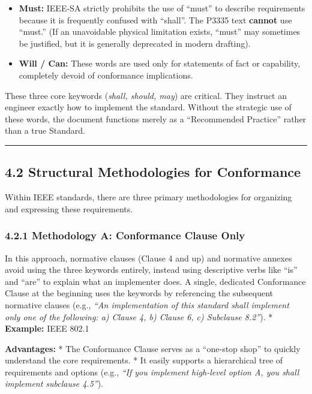 \documentclass[
]{article}
\begin{document}
\begin{itemize}
\item
  \textbf{Must:} IEEE-SA strictly prohibits the use of ``must'' to
  describe requirements because it is frequently confused with
  ``shall''. The P3335 text \textbf{cannot} use ``must.'' (If an
  unavoidable physical limitation exists, ``must'' may sometimes be
  justified, but it is generally deprecated in modern drafting).
\item
  \textbf{Will / Can:} These words are used only for statements of fact
  or capability, completely devoid of conformance implications.
\end{itemize}

These three core keywords (\emph{shall, should, may}) are critical. They
instruct an engineer exactly how to implement the standard. Without the
strategic use of these words, the document functions merely as a
``Recommended Practice'' rather than a true Standard.

\begin{center}\rule{0.5\linewidth}{0.5pt}\end{center}

\subsection{4.2 Structural Methodologies for
Conformance}\label{structural-methodologies-for-conformance}

Within IEEE standards, there are three primary methodologies for
organizing and expressing these requirements.

\subsubsection{4.2.1 Methodology A: Conformance Clause
Only}\label{methodology-a-conformance-clause-only}

In this approach, normative clauses (Clause 4 and up) and normative
annexes avoid using the three keywords entirely, instead using
descriptive verbs like ``is'' and ``are'' to explain what an implementer
does. A single, dedicated Conformance Clause at the beginning uses the
keywords by referencing the subsequent normative clauses (e.g.,
\emph{``An implementation of this standard shall implement only one of
the following: a) Clause 4, b) Clause 6, c) Subclause 8.2''}). *
\textbf{Example:} IEEE 802.1

\textbf{Advantages:} * The Conformance Clause serves as a ``one-stop
shop'' to quickly understand the core requirements. * It easily supports
a hierarchical tree of requirements and options (e.g., \emph{``If you
implement high-level option A, you shall implement subclause 4.5''}).
\end{document}
